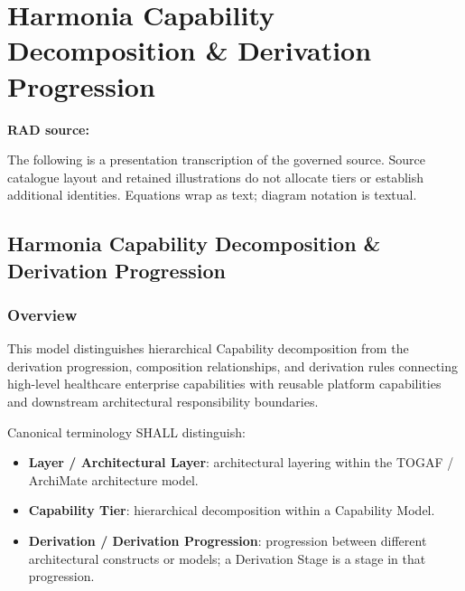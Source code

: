 \chapter{Harmonia Capability Decomposition \& Derivation Progression}\label{rad:tier-model}
\noindent\textbf{RAD source:} \texttt{}

The following is a presentation transcription of the governed source. Source catalogue layout and retained illustrations do not allocate tiers or establish additional identities. Equations wrap as text; diagram notation is textual.

\label{rad:tier-model:1}
\section*{Harmonia Capability Decomposition \& Derivation Progression}
\label{rad:tier-model:3}
\subsection*{Overview}
\label{rad:tier-model:5}

This model distinguishes hierarchical Capability decomposition from the derivation progression, composition relationships, and derivation rules connecting high-level healthcare enterprise capabilities with reusable platform capabilities and downstream architectural responsibility boundaries.

\label{rad:tier-model:7}

Canonical terminology SHALL distinguish:

\label{rad:tier-model:9}

\begin{itemize}

\item
\textbf{Layer /\allowbreak{} Architectural Layer}: architectural layering within the TOGAF /\allowbreak{} ArchiMate architecture model.



\item
\textbf{Capability Tier}: hierarchical decomposition within a Capability Model.



\item
\textbf{Derivation /\allowbreak{} Derivation Progression}: progression between different architectural constructs or models; a Derivation Stage is a stage in that progression.



\end{itemize}
\label{rad:tier-model:13}

